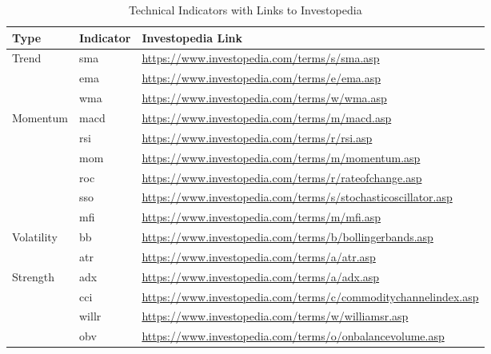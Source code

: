 \begin{table}[H]
\label{tab:docind}
\centering
\caption{Technical Indicators with Links to Investopedia}
\begin{tabular}{lp{4cm}p{7.5cm}}
\hline
\textbf{Type} & \textbf{Indicator} & \textbf{Investopedia Link} \\
\hline\hline
Trend & \acrfull{sma} & \url{https://www.investopedia.com/terms/s/sma.asp} \\
\cline{2-3}
      & \acrfull{ema} & \url{https://www.investopedia.com/terms/e/ema.asp} \\
\cline{2-3}
      & \acrfull{wma} & \url{https://www.investopedia.com/terms/w/wma.asp} \\
\hline
Momentum & \acrfull{macd} & \url{https://www.investopedia.com/terms/m/macd.asp} \\
\cline{2-3}
         & \acrfull{rsi} & \url{https://www.investopedia.com/terms/r/rsi.asp} \\
\cline{2-3}
         & \acrfull{mom} & \url{https://www.investopedia.com/terms/m/momentum.asp} \\
\cline{2-3}
         & \acrfull{roc} & \url{https://www.investopedia.com/terms/r/rateofchange.asp} \\
\cline{2-3}
         & \acrfull{sso} & \url{https://www.investopedia.com/terms/s/stochasticoscillator.asp} \\
\cline{2-3}
         & \acrfull{mfi} & \url{https://www.investopedia.com/terms/m/mfi.asp} \\
\hline
Volatility & \acrfull{bb} & \url{https://www.investopedia.com/terms/b/bollingerbands.asp} \\
\cline{2-3}
           & \acrfull{atr} & \url{https://www.investopedia.com/terms/a/atr.asp} \\
\hline
Strength & \acrfull{adx} & \url{https://www.investopedia.com/terms/a/adx.asp} \\
\cline{2-3}
         & \acrfull{cci} & \url{https://www.investopedia.com/terms/c/commoditychannelindex.asp} \\
\cline{2-3}
         & \acrfull{willr} & \url{https://www.investopedia.com/terms/w/williamsr.asp} \\
\cline{2-3}
         & \acrfull{obv} & \url{https://www.investopedia.com/terms/o/onbalancevolume.asp} \\
\hline
\end{tabular}
\end{table}

